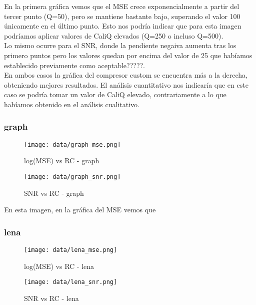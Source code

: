 \documentclass[12pt,a4paper]{article}
\begin{document}
En la primera gráfica vemos que el MSE crece exponencialmente a partir del tercer punto (Q=50), pero se mantiene bastante bajo, superando el valor 100 únicamente en el último punto. Esto nos podría indicar que para esta imagen podríamos aplicar valores de CaliQ elevados (Q=250 o incluso Q=500).\\

Lo mismo ocurre para el SNR, donde la pendiente negaiva aumenta tras los primero puntos pero los valores quedan por encima del valor de 25 que habíamos establecido previamente como aceptable?????.\\

En ambos casos la gráfica del compresor custom se encuentra más a la derecha, obteniendo mejores resultados. El análisis cuantitativo nos indicaría que en este caso se podría tomar un valor de CaliQ elevado, contrariamente a lo que habíamos obtenido en el análisis cualitativo.\\


\subsubsection{graph}
\hspace*{-2.5em}
\begin{minipage}{0.5\textwidth}
        \centering
        \begin{figure}[H]
    \centering
    \texttt{[image: data/graph\_mse.png]}
    \caption{log(MSE) vs RC - graph}
    
\end{figure}
\end{minipage}\hfill
    \begin{minipage}{0.5\textwidth}
        \begin{figure}[H]
    \centering
    \texttt{[image: data/graph\_snr.png]}
    \caption{SNR vs RC - graph}
    
\end{figure}
\end{minipage}
\vspace{2em}

En esta imagen, en la gráfica del MSE vemos que 


\subsubsection{lena}
\hspace*{-2.5em}
\begin{minipage}{0.5\textwidth}
        \centering
        \begin{figure}[H]
    \centering
    \texttt{[image: data/lena\_mse.png]}
    \caption{log(MSE) vs RC - lena}
    
\end{figure}
\end{minipage}\hfill
    \begin{minipage}{0.5\textwidth}
        \centering
        \begin{figure}[H]
    \centering
    \texttt{[image: data/lena\_snr.png]}
    \caption{SNR vs RC - lena}
    
\end{figure}
\end{minipage}
\end{document}
